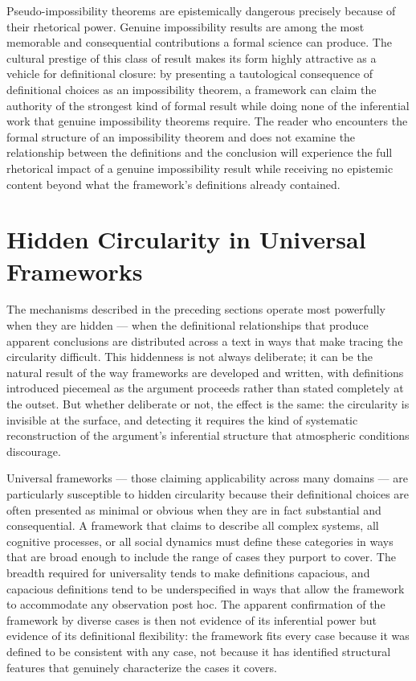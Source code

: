 \documentclass[12pt, openright, twoside]{book}
\begin{document}
Pseudo-impossibility theorems are epistemically dangerous
precisely because of their rhetorical power. Genuine
impossibility results are among the most memorable and
consequential contributions a formal science can produce.
The cultural prestige of this class of result makes its
form highly attractive as a vehicle for definitional closure:
by presenting a tautological consequence of definitional
choices as an impossibility theorem, a framework can claim
the authority of the strongest kind of formal result while
doing none of the inferential work that genuine impossibility
theorems require. The reader who encounters the formal
structure of an impossibility theorem and does not examine
the relationship between the definitions and the conclusion
will experience the full rhetorical impact of a genuine
impossibility result while receiving no epistemic content
beyond what the framework's definitions already contained.

\section{Hidden Circularity in Universal Frameworks}

The mechanisms described in the preceding sections operate
most powerfully when they are hidden --- when the definitional
relationships that produce apparent conclusions are distributed
across a text in ways that make tracing the circularity
difficult. This hiddenness is not always deliberate; it can
be the natural result of the way frameworks are developed
and written, with definitions introduced piecemeal as the
argument proceeds rather than stated completely at the outset.
But whether deliberate or not, the effect is the same: the
circularity is invisible at the surface, and detecting it
requires the kind of systematic reconstruction of the
argument's inferential structure that atmospheric conditions
discourage.

Universal frameworks --- those claiming applicability across
many domains --- are particularly susceptible to hidden
circularity because their definitional choices are often
presented as minimal or obvious when they are in fact
substantial and consequential. A framework that claims to
describe all complex systems, all cognitive processes, or
all social dynamics must define these categories in ways
that are broad enough to include the range of cases they
purport to cover. The breadth required for universality
tends to make definitions capacious, and capacious definitions
tend to be underspecified in ways that allow the framework
to accommodate any observation post hoc. The apparent
confirmation of the framework by diverse cases is then
not evidence of its inferential power but evidence of
its definitional flexibility: the framework fits every case
because it was defined to be consistent with any case,
not because it has identified structural features that
genuinely characterize the cases it covers.
\end{document}
